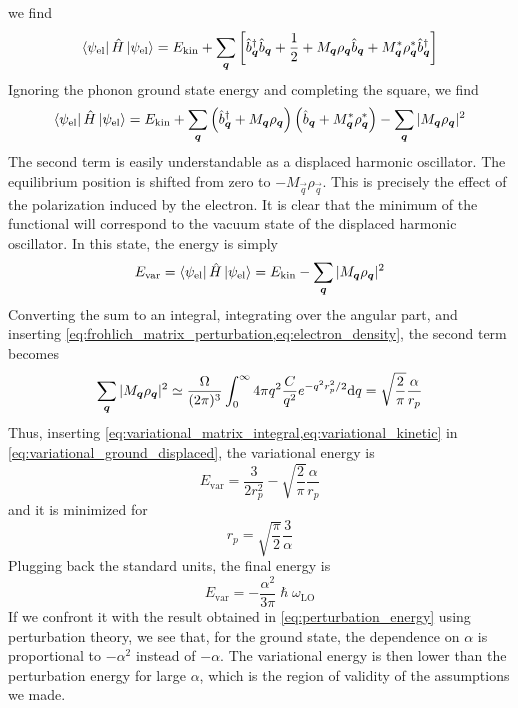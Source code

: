 we find
\begin{equation}
    \bra{\psi_\text{el}} \hat{H} \ket{\psi_\text{el}} = E_\text{kin} + \sum_{\mathbf{\boldsymbol{q}}} \left[  \hat{b}^\dagger_{ \mathbf{\boldsymbol{q}}} \hat{b}_{ \mathbf{\boldsymbol{q}}} + \frac{1}{2} + M_{\mathbf{\boldsymbol{q}}} \rho_{\mathbf{\boldsymbol{q}}} \hat{b}_{\mathbf{\boldsymbol{q}}} +  M^*_{\mathbf{\boldsymbol{q}}} \rho^*_{\mathbf{\boldsymbol{q}}} \hat{b}^\dagger_{\mathbf{\boldsymbol{q}}} \right]
\end{equation}
Ignoring the phonon ground state energy and completing the square, we find
\begin{equation}
    \bra{\psi_\text{el}} \hat{H} \ket{\psi_\text{el}} = E_\text{kin} + \sum_{\mathbf{\boldsymbol{q}}} \left( \hat{b}^\dagger_{\mathbf{\boldsymbol{q}}} + M_{\mathbf{\boldsymbol{q}}}\rho_{\mathbf{\boldsymbol{q}}} \right)\left( \hat{b}_{\mathbf{\boldsymbol{q}}} + M^*_{\mathbf{\boldsymbol{q}}}\rho^*_{\mathbf{\boldsymbol{q}}} \right) - \sum_{\mathbf{\boldsymbol{q}}} |M_{\mathbf{\boldsymbol{q}}}\rho_{\mathbf{\boldsymbol{q}}}|^2
\end{equation}
The second term is easily understandable as a displaced harmonic oscillator. The equilibrium position is shifted from zero to $-M_\vec{q}\rho_\vec{q}$. This is precisely the effect of the polarization induced by the electron. It is clear that the minimum of the functional will correspond to the vacuum state of the displaced harmonic oscillator. In this state, the energy is simply
\begin{equation} \label{eq:variational_ground_displaced}
    E_\text{var} = \bra{\psi_\text{el}} \hat{H} \ket{\psi_\text{el}} = E_\text{kin} - \sum_{\mathbf{\boldsymbol{q}}} |M_{\mathbf{\boldsymbol{q}}}\rho_{\mathbf{\boldsymbol{q}}}|^2
\end{equation}
Converting the sum to an integral, integrating over the angular part, and inserting \cref{eq:frohlich_matrix_perturbation,eq:electron_density}, the second term becomes
\begin{equation} \label{eq:variational_matrix_integral}
    \sum_\vec{q} |M_\vec{q}\rho_\vec{q}|^2 \simeq \frac{\Omega}{(2\pi)^3} \int_0^\infty  4\pi q^2 \frac{C}{q^2} e^{-q^2r_p^2/2} \differential q = \sqrt{\frac{2}{\pi}} \frac{\alpha}{r_p}
\end{equation}
Thus, inserting \cref{eq:variational_matrix_integral,eq:variational_kinetic} in \cref{eq:variational_ground_displaced}, the variational energy is
\begin{equation}
    E_\text{var} = \frac{3}{2r_p^2} - \sqrt{\frac{2}{\pi}} \frac{\alpha}{r_p}
\end{equation}
and it is minimized for
\begin{equation}
    r_p = \sqrt{\frac{\pi}{2}}\frac{3}{\alpha}
\end{equation}
Plugging back the standard units, the final energy is
\begin{equation}
    E_\text{var} = -\frac{\alpha^2}{3\pi} \hslash\omega_\text{LO}
\end{equation}
If we confront it with the result obtained in \cref{eq:perturbation_energy} using perturbation theory, we see that, for the ground state, the dependence on $\alpha$ is proportional to $-\alpha^2$ instead of $-\alpha$. The variational energy is then lower than the perturbation energy for large $\alpha$, which is the region of validity of the assumptions we made.